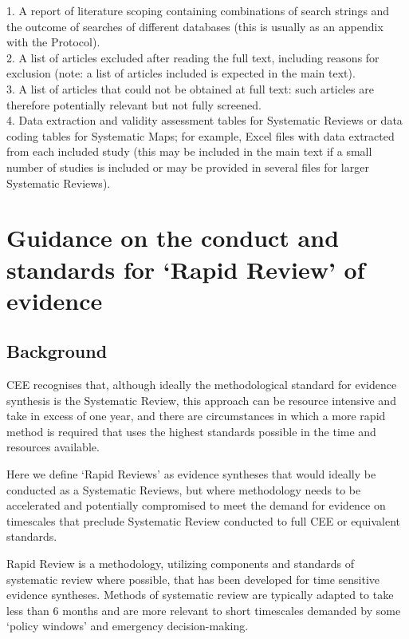 \documentclass[
  letterpaper,
  DIV=11,
  numbers=noendperiod]{scrreprt}
\begin{document}
1. A report of literature scoping containing combinations of search
strings and the outcome of searches of different databases (this is
usually as an appendix with the Protocol).\\
2. A list of articles excluded after reading the full text, including
reasons for exclusion (note: a list of articles included is expected in
the main text).\\
3. A list of articles that could not be obtained at full text: such
articles are therefore potentially relevant but not fully screened.\\
4. Data extraction and validity assessment tables for Systematic Reviews
or data coding tables for Systematic Maps; for example, Excel files with
data extracted from each included study (this may be included in the
main text if a small number of studies is included or may be provided in
several files for larger Systematic Reviews).


\chapter{Guidance on the conduct and standards for `Rapid Review' of
evidence}\label{sec-chapt10}

\section{Background}\label{background-3}

CEE recognises that, although ideally the methodological standard for
evidence synthesis is the Systematic Review, this approach can be
resource intensive and take in excess of one year, and there are
circumstances in which a more rapid method is required that uses the
highest standards possible in the time and resources available.

Here we define `Rapid Reviews' as evidence syntheses that would ideally
be conducted as a Systematic Reviews, but where methodology needs to be
accelerated and potentially compromised to meet the demand for evidence
on timescales that preclude Systematic Review conducted to full CEE or
equivalent standards.

Rapid Review is a methodology, utilizing components and standards of
systematic review where possible, that has been developed for time
sensitive evidence syntheses. Methods of systematic review are typically
adapted to take less than 6 months and are more relevant to short
timescales demanded by some `policy windows' and emergency
decision-making.
\end{document}
